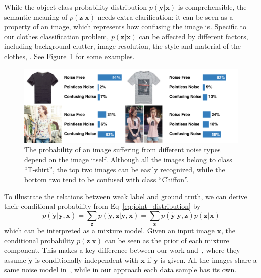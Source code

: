 \documentclass[10pt,twocolumn,letterpaper]{article}
\def\vec{\mathbf}
\begin{document}
While the object class probability distribution $p(\vec{y} | \vec{x})$ is comprehensible, the semantic meaning of $p(\vec{z} | \vec{x})$ needs extra clarification: it can be seen as a property of an image, which represents how confusing the image is. Specific to our clothes classification problem, $p(\vec{z} | \vec{x})$ can be affected by different factors, including background clutter, image resolution, the style and material of the clothes, \etc. See Figure~\ref{fig:compare_noise_level} for some examples.

\begin{figure}[t]
\begin{center}
\includegraphics[width=1.0\linewidth]{figure/noise_level.pdf}
\end{center}
\caption{The probability of an image suffering from different noise types depend on the image itself. Although all the images belong to class ``T-shirt'', the top two images can be easily recognized, while the bottom two tend to be confused with class ``Chiffon''.}
\label{fig:compare_noise_level}
\end{figure}

To illustrate the relations between weak label and ground truth, we can derive their conditional probability from Eq~\ref{eq:joint_distribution} by
\begin{equation}
    p(\tilde{\vec{y}} | \vec{y}, \vec{x}) = \sum_{\vec{z}} p(\tilde{\vec{y}}, \vec{z} | \vec{y}, \vec{x}) = \sum_{\vec{z}} p(\tilde{\vec{y}} | \vec{y}, \vec{z}) p(\vec{z} | \vec{x})
\end{equation}
which can be interpreted as a mixture model. Given an input image $\vec{x}$, the conditional probability $p(\vec{z} | \vec{x})$ can be seen as the prior of each mixture component. This makes a key difference between our work and~\cite{sukhbaatar2014learning}, where they assume $\tilde{\vec{y}}$ is conditionally independent with $\vec{x}$ if $\vec{y}$ is given. All the images share a same noise model in~\cite{sukhbaatar2014learning}, while in our approach each data sample has its own.
\end{document}
